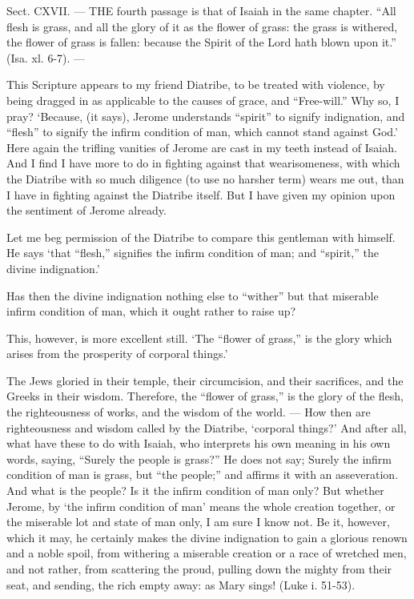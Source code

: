 
Sect. CXVII. — THE fourth passage is that of Isaiah in the same chapter. “All flesh is grass, and all the glory of it as the flower of grass: the grass is withered, the flower of grass is fallen: because the Spirit of the Lord hath blown upon it.” (Isa. xl. 6-7). —

This Scripture appears to my friend Diatribe, to be treated with violence, by being dragged in as applicable to the causes of grace, and “Free-will.” Why so, I pray? ‘Because, (it says), Jerome understands “spirit” to signify indignation, and “flesh” to signify the infirm condition of man, which cannot stand against God.’ Here again the trifling vanities of Jerome are cast in my teeth instead of Isaiah. And I find I have more to do in fighting against that wearisomeness, with which the Diatribe with so much diligence (to use no harsher term) wears me out, than I have in fighting against the Diatribe itself. But I have given my opinion upon the sentiment of Jerome already.

Let me beg permission of the Diatribe to compare this gentleman with himself. He says ‘that “flesh,” signifies the infirm condition of man; and “spirit,” the divine indignation.’

Has then the divine indignation nothing else to “wither” but that miserable infirm condition of man, which it ought rather to raise up?

This, however, is more excellent still. ‘The “flower of grass,” is the glory which arises from the prosperity of corporal things.’

The Jews gloried in their temple, their circumcision, and their sacrifices, and the Greeks in their wisdom. Therefore, the “flower of grass,” is the glory of the flesh, the righteousness of works, and the wisdom of the world. — How then are righteousness and wisdom called by the Diatribe, ‘corporal things?’ And after all, what have these to do with Isaiah, who interprets his own meaning in his own words, saying, “Surely the people is grass?” He does not say; Surely the infirm condition of man is grass, but “the people;” and affirms it with an asseveration. And what is the people? Is it the infirm condition of man only? But whether Jerome, by ‘the infirm condition of man’ means the whole creation together, or the miserable lot and state of man only, I am sure I know not. Be it, however, which it may, he certainly makes the divine indignation to gain a glorious renown and a noble spoil, from withering a miserable creation or a race of wretched men, and not rather, from scattering the proud, pulling down the mighty from their seat, and sending, the rich empty away: as Mary sings! (Luke i. 51-53).

